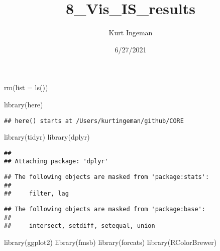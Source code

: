 \documentclass[
]{article}
\title{8\_Vis\_IS\_results}
\author{Kurt Ingeman}
\date{6/27/2021}
\newenvironment{Shaded}{\begin{snugshade}}{\end{snugshade}}
\newcommand{\AttributeTok}[1]{\textcolor[rgb]{0.77,0.63,0.00}{#1}}
\newcommand{\FunctionTok}[1]{\textcolor[rgb]{0.00,0.00,0.00}{#1}}
\newcommand{\NormalTok}[1]{#1}
\begin{document}
\maketitle

\begin{Shaded}
\begin{Highlighting}[]
\FunctionTok{rm}\NormalTok{(}\AttributeTok{list =} \FunctionTok{ls}\NormalTok{())}

\FunctionTok{library}\NormalTok{(here)}
\end{Highlighting}
\end{Shaded}

\begin{verbatim}
## here() starts at /Users/kurtingeman/github/CORE
\end{verbatim}

\begin{Shaded}
\begin{Highlighting}[]
\FunctionTok{library}\NormalTok{(tidyr)}
\FunctionTok{library}\NormalTok{(dplyr)}
\end{Highlighting}
\end{Shaded}

\begin{verbatim}
## 
## Attaching package: 'dplyr'
\end{verbatim}

\begin{verbatim}
## The following objects are masked from 'package:stats':
## 
##     filter, lag
\end{verbatim}

\begin{verbatim}
## The following objects are masked from 'package:base':
## 
##     intersect, setdiff, setequal, union
\end{verbatim}

\begin{Shaded}
\begin{Highlighting}[]
\FunctionTok{library}\NormalTok{(ggplot2)}
\FunctionTok{library}\NormalTok{(fmsb)}
\FunctionTok{library}\NormalTok{(forcats)}
\FunctionTok{library}\NormalTok{(RColorBrewer)}
\end{Highlighting}
\end{Shaded}
\end{document}

